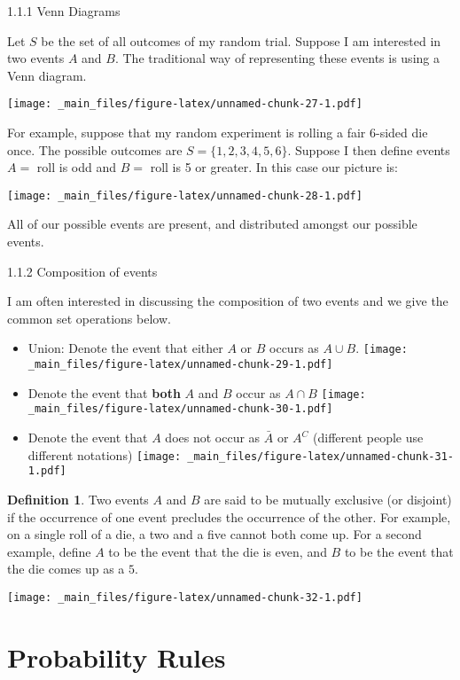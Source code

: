 \documentclass[]{book}
\begin{document}
1.1.1 Venn Diagrams

Let \(S\) be the set of all outcomes of my random trial. Suppose I am
interested in two events \(A\) and \(B\). The traditional way of
representing these events is using a Venn diagram.

\texttt{[image: \_main\_files/figure-latex/unnamed-chunk-27-1.pdf]}

For example, suppose that my random experiment is rolling a fair 6-sided
die once. The possible outcomes are \(S=\{1,2,3,4,5,6\}\). Suppose I
then define events \(A=\) roll is odd and \(B=\) roll is 5 or greater.
In this case our picture is:

\texttt{[image: \_main\_files/figure-latex/unnamed-chunk-28-1.pdf]}

All of our possible events are present, and distributed amongst our
possible events.

1.1.2 Composition of events

I am often interested in discussing the composition of two events and we
give the common set operations below.

\begin{itemize}
\item
  Union: Denote the event that either \(A\) or \(B\) occurs as
  \(A\cup B\).
  \texttt{[image: \_main\_files/figure-latex/unnamed-chunk-29-1.pdf]}
\item
  Denote the event that \textbf{both} \(A\) and \(B\) occur as
  \(A\cap B\)
  \texttt{[image: \_main\_files/figure-latex/unnamed-chunk-30-1.pdf]}
\item
  Denote the event that \(A\) does not occur as \(\bar{A}\) or \(A^{C}\)
  (different people use different notations)
  \texttt{[image: \_main\_files/figure-latex/unnamed-chunk-31-1.pdf]}
\end{itemize}

\textbf{Definition 1}. Two events \(A\) and \(B\) are said to be
mutually exclusive (or disjoint) if the occurrence of one event
precludes the occurrence of the other. For example, on a single roll of
a die, a two and a five cannot both come up. For a second example,
define \(A\) to be the event that the die is even, and \(B\) to be the
event that the die comes up as a \(5\).

\texttt{[image: \_main\_files/figure-latex/unnamed-chunk-32-1.pdf]}

\section{Probability Rules}\label{probability-rules}
\end{document}
